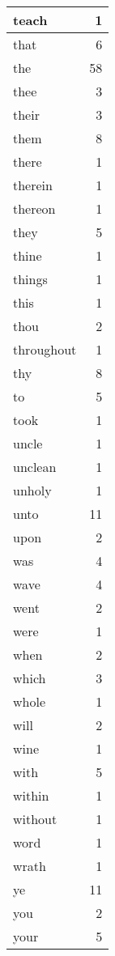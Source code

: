 \begin{center}
\begin{longtable}{l|r}
teach & 1 \\ \hline
that & 6 \\ \hline
the & 58 \\ \hline
thee & 3 \\ \hline
their & 3 \\ \hline
them & 8 \\ \hline
there & 1 \\ \hline
therein & 1 \\ \hline
thereon & 1 \\ \hline
they & 5 \\ \hline
thine & 1 \\ \hline
things & 1 \\ \hline
this & 1 \\ \hline
thou & 2 \\ \hline
throughout & 1 \\ \hline
thy & 8 \\ \hline
to & 5 \\ \hline
took & 1 \\ \hline
uncle & 1 \\ \hline
unclean & 1 \\ \hline
unholy & 1 \\ \hline
unto & 11 \\ \hline
upon & 2 \\ \hline
was & 4 \\ \hline
wave & 4 \\ \hline
went & 2 \\ \hline
were & 1 \\ \hline
when & 2 \\ \hline
which & 3 \\ \hline
whole & 1 \\ \hline
will & 2 \\ \hline
wine & 1 \\ \hline
with & 5 \\ \hline
within & 1 \\ \hline
without & 1 \\ \hline
word & 1 \\ \hline
wrath & 1 \\ \hline
ye & 11 \\ \hline
you & 2 \\ \hline
your & 5 \\ \hline
\end{longtable}
\end{center}



\normalsize



